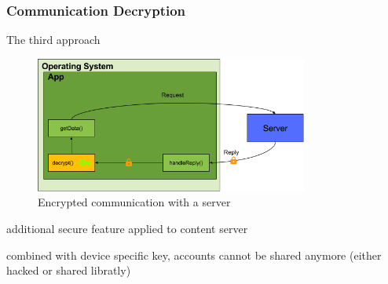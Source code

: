 \subsubsection{Communication Decryption} \label{section:counter-replace-encryption-content-communication}
The third approach
\begin{figure}[h]
    \centering
    \includegraphics[width=0.8\textwidth]{data/encryptionComm.png}
    \caption{Encrypted communication with a server}
    \label{fig:encryptionComm}
\end{figure}

additional secure feature applied to content server

combined with device specific key, accounts cannot be shared anymore (either hacked or shared libratly)
